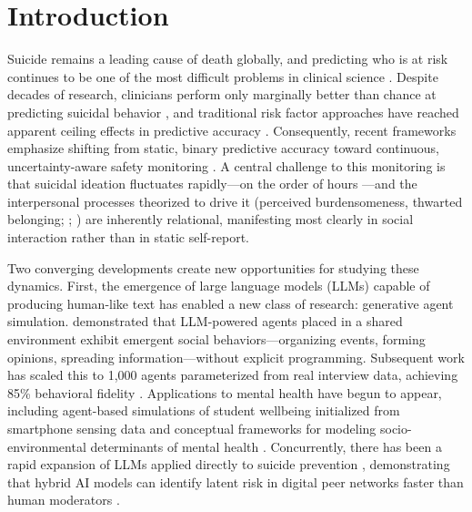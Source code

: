 \documentclass[review,12pt,authoryear]{elsarticle}
\begin{document}
\linenumbers

\section{Introduction}

Suicide remains a leading cause of death globally, and predicting who is at risk continues to be one of the most difficult problems in clinical science \citep{franklin2017risk}. Despite decades of research, clinicians perform only marginally better than chance at predicting suicidal behavior \citep{large2017meta}, and traditional risk factor approaches have reached apparent ceiling effects in predictive accuracy \citep{belsher2019prediction}. Consequently, recent frameworks emphasize shifting from static, binary predictive accuracy toward continuous, uncertainty-aware safety monitoring \citep{smith2026near}. A central challenge to this monitoring is that suicidal ideation fluctuates rapidly---on the order of hours \citep{kleiman2017examination}---and the interpersonal processes theorized to drive it (perceived burdensomeness, thwarted belonging; \citealt{joiner2005why}; \citealt{vanorden2010interpersonal}) are inherently relational, manifesting most clearly in social interaction rather than in static self-report.

Two converging developments create new opportunities for studying these dynamics. First, the emergence of large language models (LLMs) capable of producing human-like text has enabled a new class of research: generative agent simulation. \citet{park2023generative} demonstrated that LLM-powered agents placed in a shared environment exhibit emergent social behaviors---organizing events, forming opinions, spreading information---without explicit programming. Subsequent work has scaled this to 1,000 agents parameterized from real interview data, achieving 85\% behavioral fidelity \citep{park2024generative}. Applications to mental health have begun to appear, including agent-based simulations of student wellbeing initialized from smartphone sensing data \citep{zhao2025studentlife} and conceptual frameworks for modeling socio-environmental determinants of mental health \citep{kambeitz2025modelling}. Concurrently, there has been a rapid expansion of LLMs applied directly to suicide prevention \citep{holmes2025scoping}, demonstrating that hybrid AI models can identify latent risk in digital peer networks faster than human moderators \citep{chen2026hybrid}. 
\end{document}
